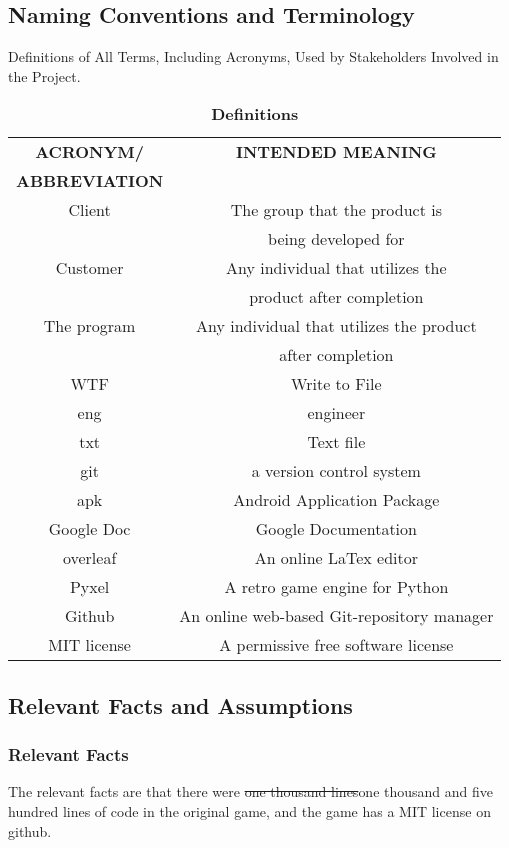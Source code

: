 \documentclass[12pt, titlepage]{article}
\begin{document}
\subsection{Naming Conventions and Terminology}
Definitions of All Terms, Including Acronyms, Used by Stakeholders Involved in the Project.\\
\begin{table}[!h]
\caption{\bf Definitions}
\begin{tabular}{|c|c|}
    \hline
    \textbf{ACRONYM/}&\textbf{INTENDED MEANING} \\
    \textbf{ABBREVIATION}&\\
    \hline     
    Client&The group that the product is \\
    &being developed for\\
    \hline
    Customer&Any individual that utilizes the \\
    &product after completion\\
    \hline
    The program&Any individual that utilizes the product\\
    &after completion\\
    \hline
    WTF&Write to File\\
    \hline
    eng&engineer\\
    \hline
    txt&Text file\\
    \hline
    git&a version control system\\
    \hline
    apk&Android Application Package \\
    \hline
    Google Doc&Google Documentation\\
    \hline
    overleaf&An online LaTex editor\\
    \hline
    Pyxel&A retro game engine for Python\\
    \hline
    Github&An online web-based Git-repository manager \\
    \hline
    MIT license&A permissive free software license\\
    \hline
\end{tabular}
\end{table}

\subsection{Relevant Facts and Assumptions}
\subsubsection{Relevant Facts}
The relevant facts are that there were \sout{one thousand lines}{\color{red}one thousand and five hundred lines} of code in the original game, and the game has a MIT license on github.
\end{document}
